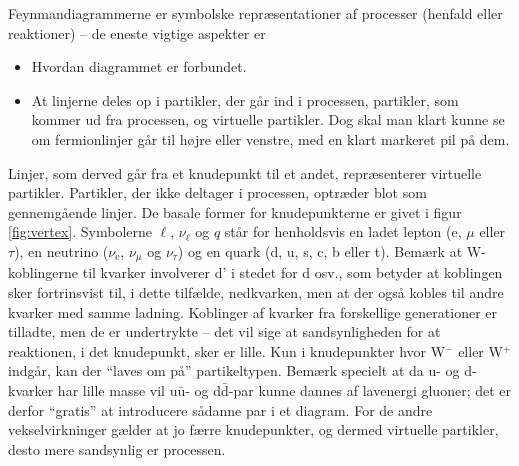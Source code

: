%
Feynmandiagrammerne er symbolske repræsentationer af processer (henfald eller reaktioner) -- de eneste vigtige aspekter er
\begin{itemize}
    \item Hvordan diagrammet er forbundet. \\
    \item At linjerne deles op i partikler, der går ind i processen, partikler, som kommer ud fra processen, og virtuelle partikler.  Dog skal man klart kunne se om fermionlinjer går til højre eller
venstre, med en klart markeret pil på dem.
\end{itemize}
%
Linjer, som derved går fra et knudepunkt til et andet, repræsenterer virtuelle partikler. Partikler, der ikke deltager i processen, optræder blot som gennemgående linjer. De basale former for knudepunkterne er givet i figur \ref{fig:vertex}. Symbolerne $\ell$, $\nu_{\ell}$ og $q$ står for henholdsvis en ladet lepton (e, $\mu$ eller $\tau$), en neutrino ($\nu_\mathrm{e}$, $\nu_{\mu}$ og $\nu_{\tau}$) og en quark (d, u, s, c, b eller t). Bemærk at W-koblingerne til kvarker involverer d' i stedet for d osv., som betyder at koblingen sker fortrinsvist til, i dette tilfælde, nedkvarken, men at der også kobles til andre kvarker med samme ladning. Koblinger af kvarker fra forskellige generationer er tilladte, men de er undertrykte -- det vil sige at sandsynligheden for at reaktionen, i det knudepunkt, sker er lille.  Kun i knudepunkter hvor W$^-$ eller W$^+$ indgår, kan der ``laves om på'' partikeltypen. Bemærk specielt at da u- og d-kvarker har lille masse vil u$\bar{\mathrm{u}}$- og d$\bar{\mathrm d}$-par kunne dannes af lavenergi gluoner; det er
derfor ``gratis'' at introducere sådanne par i et diagram.  For de andre vekselvirkninger gælder at jo færre knudepunkter, og dermed virtuelle partikler, desto mere sandsynlig er processen. \\

